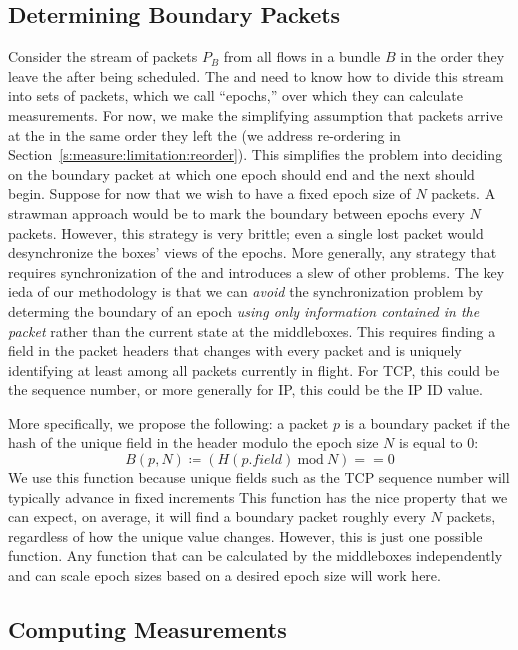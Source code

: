 \subsection{Determining Boundary Packets}
\label{s:measure:marking}
Consider the stream of packets $P_B$ from all flows in a bundle $B$ in the order they leave the 
\inbox after being scheduled. The \inbox and \outbox need to know how to divide this stream into sets 
of packets, which we call ``epochs,'' over which they can calculate measurements. 
For now, we make the simplifying assumption that packets arrive at the \outbox in the same order they 
left the \inbox (we address re-ordering in Section~\ref{s:measure:limitation:reorder}).
This simplifies the problem into deciding on the boundary packet at which one epoch should
end and the next should begin. 
Suppose for now that we wish to have a fixed epoch size of $N$ packets.
A strawman approach would be to mark the boundary between epochs every $N$ packets. However,
this strategy is very brittle; even a single lost packet would desynchronize the boxes' views
of the epochs. More generally, any strategy that requires synchronization of the \inbox and
\outbox introduces a slew of other problems.
The key ieda of our methodology is that we can \emph{avoid} the synchronization problem by determing 
the boundary of an epoch \emph{using only information contained in the packet} rather than the current
state at the middleboxes.   
This requires finding a field in the packet headers that changes with every packet and is
uniquely identifying at least among all packets currently in flight.
For TCP, this could be the sequence number, or more generally for IP, this could be the IP ID value.

More specifically, we propose the following: a packet $p$ is a boundary packet if the hash 
of the unique field in the header modulo the epoch size $N$ is equal to 0:
$$B(p,N) \coloneqq (H(p.field)\ \text{mod}\ N) == 0$$
We use this function because unique fields such as the TCP sequence number will typically advance
in fixed increments 
This function has the nice property that we can expect, on average, it will find a boundary 
packet roughly every $N$ packets, regardless of how the unique value changes.
However, this is just one possible function. Any function that can be calculated by the middleboxes
independently and can scale epoch sizes based on a desired epoch size will work here. 

\subsection{Computing Measurements}
\label{s:measure:compute}
\newcommand{\pone}{$p_{prev}$}
\newcommand{\hpone}{$h(p_{prev})$}
\newcommand{\sone}{$s_{prev}$}
\newcommand{\rone}{$r_{prev}$}
\newcommand{\ptwo}{$p_{curr}$}
\newcommand{\hptwo}{$h(p_{curr})$}
\newcommand{\stwo}{$s_{curr}$}
\newcommand{\rtwo}{$r_{curr}$}
\newcommand{\atwo}{$a_{curr}$}
\newcommand{\sentone}{$sent_{prev}$}
\newcommand{\recvdone}{$rcvd_{prev}$}
\newcommand{\senttwo}{$sent_{curr}$}
\newcommand{\recvdtwo}{$rcvd_{curr}$}


